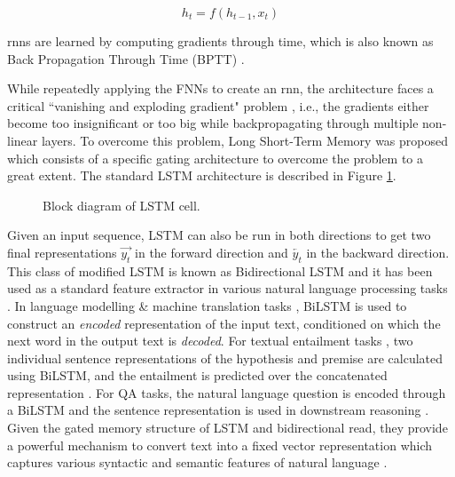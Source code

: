 \documentclass[letterpaper, 12pt]{report}
\begin{document}
\begin{equation}
    h_t = f(h_{t-1}, x_t)
\end{equation}{}

\acrshort{rnn}s are learned by computing gradients through time, which is also known as Back Propagation Through Time (BPTT) \citep{rumelhart1986learning}.

While repeatedly applying the FNNs to create an \acrshort{rnn}, the architecture faces a critical ``vanishing and exploding gradient" problem \citep{hochreiter2001gradient}, i.e., the gradients either become too insignificant or too big while backpropagating through multiple non-linear layers. To overcome this problem, Long Short-Term Memory \citep{hochreiter1997long} was proposed which consists of a specific gating architecture to overcome the problem to a great extent. The standard LSTM architecture is described in Figure \ref{fig:bg_lstm}.

\begin{figure}
  \centering
  \resizebox{10cm}{!}{}
  \caption{Block diagram of LSTM cell.}
  \label{fig:bg_lstm}
\end{figure}

Given an input sequence, LSTM can also be run in both directions to get two final representations $\overrightarrow{y_t}$ in the forward direction and $\overleftarrow{y_t}$ in the backward direction. This class of modified LSTM is known as Bidirectional LSTM and it has been used as a standard feature extractor in various natural language processing tasks \cite{Rocktaschel2015-rr, wang2016machine, serban2016building}. In language modelling \& machine translation tasks \citep{serban2016building, serban2017hierarchical, bahdanau2014neural}, BiLSTM is used to construct an \textit{encoded} representation of the input text, conditioned on which the next word in the output text is \textit{decoded}. For textual entailment tasks \citep{bowman-etal-2015-large}, two individual sentence representations of the hypothesis and premise are calculated using BiLSTM, and the entailment is predicted over the concatenated representation \citep{Rocktaschel2015-rr}. For QA tasks, the natural language question is encoded through a BiLSTM and the sentence representation is used in downstream reasoning \citep{wang2016machine}. Given the gated memory structure of LSTM and bidirectional read, they provide a powerful mechanism to convert text into a fixed vector representation which captures various syntactic and semantic features of natural language \citep{conneau2018cram}.
\end{document}
